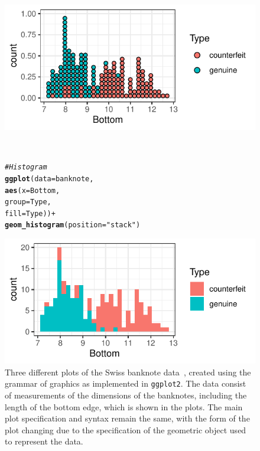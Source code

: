 \documentclass[letterpaper]{ar-1col}\usepackage[]{graphicx}\usepackage[]{color}
\makeatletter
\newcommand{\hlstr}[1]{\textcolor[rgb]{0.192,0.494,0.8}{#1}}%
\newcommand{\hlcom}[1]{\textcolor[rgb]{0.678,0.584,0.686}{\textit{#1}}}%
\newcommand{\hlopt}[1]{\textcolor[rgb]{0,0,0}{#1}}%
\newcommand{\hlstd}[1]{\textcolor[rgb]{0.345,0.345,0.345}{#1}}%
\newcommand{\hlkwc}[1]{\textcolor[rgb]{0.333,0.667,0.333}{#1}}%
\newcommand{\hlkwd}[1]{\textcolor[rgb]{0.737,0.353,0.396}{\textbf{#1}}}%
\newenvironment{kframe}{%
 \def\at@end@of@kframe{}%
 \ifinner\ifhmode%
  \def\at@end@of@kframe{\end{minipage}}%
  \begin{minipage}{\columnwidth}%
 \fi\fi%
 \def\FrameCommand##1{\hskip\@totalleftmargin \hskip-\fboxsep
 \colorbox{shadecolor}{##1}\hskip-\fboxsep
     \hskip-\linewidth \hskip-\@totalleftmargin \hskip\columnwidth}%
 \MakeFramed {\advance\hsize-\width
   \@totalleftmargin\z@ \linewidth\hsize
   \@setminipage}}%
 {\par\unskip\endMakeFramed%
 \at@end@of@kframe}
\newenvironment{knitrout}{}{} %
\makeatother
\begin{document}
\begin{figure}
\begin{minipage}{.45\textwidth}
\includegraphics[width=.99\textwidth]{figure/gg-plots-figs-2}
\end{minipage}\\
\begin{minipage}{.495\textwidth}
\begin{knitrout}
\color{fgcolor}\begin{kframe}
\begin{alltt}
\hlcom{# Histogram}
\hlkwd{ggplot}\hlstd{(}\hlkwc{data} \hlstd{= banknote,}
       \hlkwd{aes}\hlstd{(}\hlkwc{x} \hlstd{= Bottom,}
           \hlkwc{group} \hlstd{= Type,}
           \hlkwc{fill} \hlstd{= Type))} \hlopt{+}
  \hlkwd{geom_histogram}\hlstd{(}\hlkwc{position} \hlstd{=} \hlstr{"stack"}\hlstd{)}
\end{alltt}
\end{kframe}
\end{knitrout}
\end{minipage}\hfill
\begin{minipage}{.45\textwidth}
\includegraphics[width=.99\textwidth]{figure/gg-plots-figs-3}
\end{minipage}
\caption{Three different plots of the Swiss banknote data~\citep{banknote}, created using the grammar of graphics as implemented in \texttt{ggplot2}. The data consist of measurements of the dimensions of the banknotes, including the length of the bottom edge, which is shown in the plots. The main plot specification and syntax remain the same, with the form of the plot changing due to the specification of the geometric object used to represent the data.}\label{fig:grammar-graphics-plots}
\end{figure}
\end{document}
